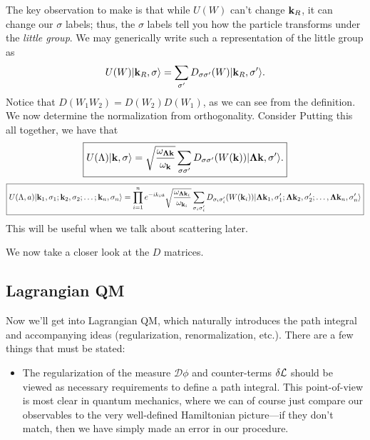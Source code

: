 \documentclass[11pt]{article}
\begin{document}
The key observation to make is that while $U(W)$
can't change $\mathbf{k}_R$, it can change our $\sigma$
labels; thus, the $\sigma$ labels tell you
how the particle transforms under the \emph{little group}. 
We may generically write such a representation of the little group
as
\begin{align*}
    U(W) \lvert\mathbf{k}_R, \sigma\rangle = \sum_{\sigma'} D_{\sigma \sigma'}(W) \lvert\mathbf{k}_R, \sigma'\rangle.
\end{align*}
Notice that $D(W_1 W_2) = D(W_2) D(W_1)$, as we can see from the definition.
We now determine the normalization from orthogonality. Consider 
Putting this all together, we have that
\begin{align*}
    \boxed{U(\Lambda)\lvert\mathbf{k}, \sigma\rangle = \sqrt{\frac{\omega_{\boldsymbol{\Lambda \mathbf{k}}}}{\omega_{\mathbf{k}}}}\sum_{\sigma \sigma'} D_{\sigma \sigma'}(W(\mathbf{k})) \lvert\boldsymbol{\Lambda \mathbf{k}}, \sigma'\rangle.}
\end{align*}
\begin{align*}
    \boxed{U(\Lambda, a)\lvert\mathbf{k}_1, \sigma_1; \mathbf{k}_2, \sigma_2; \ldots ; \mathbf{k}_n, \sigma_n\rangle
    = \prod_{i = 1}^n e^{-i k_i a}\sqrt{\frac{\omega_{\boldsymbol{\Lambda \mathbf{k}}_i}}{\omega_{\mathbf{k}_i}}} \sum_{\sigma_i \sigma_i'} D_{\sigma_i \sigma_i'}(W(\mathbf{k}_i)) \lvert\boldsymbol{\Lambda \mathbf{k}}_1, \sigma_1'; \boldsymbol{\Lambda \mathbf{k}}_2, \sigma_2'; \ldots, \boldsymbol{\Lambda \mathbf{k}}_n, \sigma_n'\rangle}
\end{align*}
This will be useful when we talk about scattering later.

We now take a closer look at the $D$ matrices. 

\subsection{Lagrangian QM}

Now we'll get into Lagrangian QM, which naturally introduces
the path integral and accompanying ideas (regularization, renormalization,
etc.). There are a few things that must be stated:
\begin{itemize}
    \item The regularization of the measure $\mathcal{D}\phi$
    and counter-terms $\delta \mathcal{L}$ should be viewed as necessary
    requirements to define a path integral. This point-of-view is most 
    clear in quantum mechanics, where we can of course just compare our
    observables to the very well-defined Hamiltonian picture---if they
    don't match, then we have simply made an error in our procedure.
\end{itemize}
\end{document}
